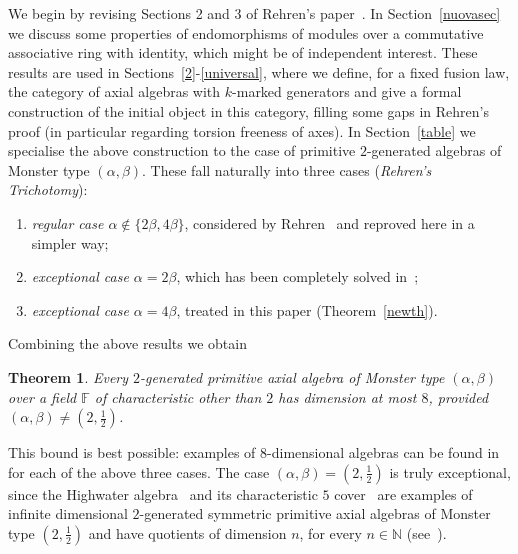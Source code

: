 \documentclass[a4paper]{amsart}
\newtheorem{theorem}[lemma]{Theorem}
\newcommand{\N}{{\mathbb N}}
\newcommand{\F}{{\mathbb F}}
\newcommand{\al}{\alpha}
\newcommand{\bt}{\beta}
\newcommand*{\red}{\color{red}}
\begin{document}
We begin by revising Sections 2 and 3 of Rehren's paper~\cite{R}. In Section~\ref{nuovasec} we discuss some properties of endomorphisms of modules over a commutative associative ring with identity, which might be of independent interest. These results are used in  Sections~\ref{2}-\ref{universal}, where we define, for a fixed fusion law, the category of axial algebras with $k$-marked generators and give a formal construction of the initial object in this category, filling some gaps in Rehren's proof (in particular regarding torsion freeness of axes). In Section~\ref{table} we specialise the above construction to the case of primitive $2$-generated 
algebras of Monster type $(\al, \bt)$. These fall naturally into three cases ({\it Rehren's Trichotomy}): 
\medskip 
\begin{enumerate}
\item [-]  {\it  regular case $\al\not \in \{2\bt, 4\bt\}$}, considered by Rehren~\cite[Theorem~3.7]{R} and reproved here in a simpler way;
 \item [-] {\it  exceptional case $\al=2\bt$}, which has been completely solved in~\cite{FMS2}; 
\item [-] {\it  exceptional case $\al=4\bt$}, treated in this paper (Theorem~\ref{newth}).
\end{enumerate}
\medskip 

Combining the above results we obtain 
\begin{theorem}\label{Felix}
Every $2$-generated primitive axial algebra of Monster type $(\alpha, \beta)$ over a field $\F$ of characteristic other than $2$ has dimension at most $8$, provided $(\alpha, \beta)\neq (2, \tfrac{1}{2})$.
\end{theorem}

This bound is best possible: examples of $8$-dimensional algebras can be found in~\cite[Table 3]{surveyS} for each of the above three cases.
%
The case $(\alpha, \beta)=(2,\frac{1}{2})$ is truly exceptional, since the Highwater algebra~\cite{HW} and its characteristic $5$ cover~\cite{FMM} are examples of infinite dimensional $2$-generated symmetric primitive axial algebras of Monster type $(2,\frac{1}{2})$ and have quotients of dimension $n$, for every $n\in \N$ (see~\cite{HW5}). 
\end{document}
